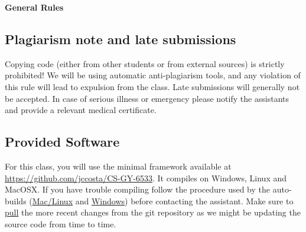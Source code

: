 \documentclass[11pt]{report}
\begin{document}




\hspace{50pt}

\begin{center}

{\Huge \textbf{General Rules}}\\
\vspace{10pt}
\end{center}

\subsection*{Plagiarism note and late submissions}
Copying code (either from other students or from external sources) is strictly prohibited! We will be using automatic anti-plagiarism tools, and any violation of this rule will lead to expulsion from the class. Late submissions will generally not be accepted. In case of serious illness or emergency please notify the assistants and provide a relevant medical certificate.

\subsection*{Provided Software}
For this class, you will use the minimal framework available at  \href{https://github.com/jccosta/CS-GY-6533}{https://github.com/jccosta/CS-GY-6533}. It compiles on Windows, Linux and MacOSX. If you have trouble compiling follow the procedure used by the auto-builds (\href{https://travis-ci.org/danielepanozzo/cg}{Mac/Linux} and \href{https://ci.appveyor.com/project/danielepanozzo/cg}{Windows}) before contacting the assistant. Make sure to \href{http://git-scm.com/book/en/v2/Git-Basics-Getting-a-Git-Repository}{pull} the more recent changes from the git repository as we might be updating the source code from time to time.
\end{document}
